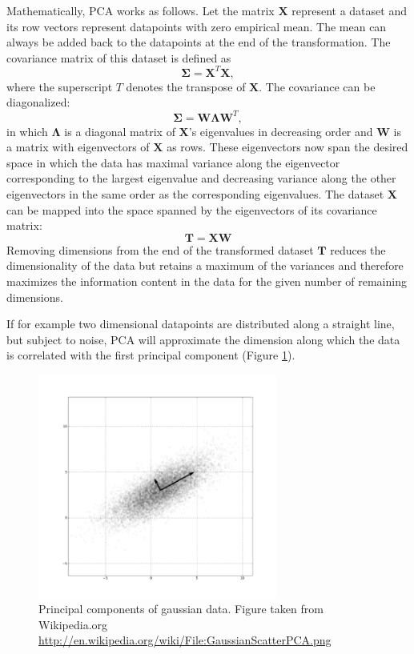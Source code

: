 \documentclass[english, a4paper, 12pt, titlepage, draft]{article}
\newcommand{\vect}[1]{\mathbf{#1}}
\begin{document}
Mathematically, PCA works as follows.
Let the matrix $\vect{X}$ represent a dataset and its row vectors represent datapoints with zero empirical mean.
The mean can always be added back to the datapoints at the end of the transformation.
The covariance matrix of this dataset is defined as
\begin{equation}
    \vect{\Sigma} = \vect{X}^{T} \vect{X},
\end{equation}
where the superscript $T$ denotes the transpose of $\vect{X}$.
The covariance can be diagonalized:
\begin{equation}
    \vect{\Sigma} = \vect{W} \vect{\Lambda} \vect{W}^{T},
\end{equation}
in which $\vect{\Lambda}$ is a diagonal matrix of $\vect{X}$'s eigenvalues in decreasing order and $\vect{W}$ is a matrix with eigenvectors of $\vect{X}$ as rows.
These eigenvectors now span the desired space in which the data has maximal variance along the eigenvector corresponding to the largest eigenvalue and decreasing variance along the other eigenvectors in the same order as the corresponding eigenvalues.
The dataset $\vect{X}$ can be mapped into the space spanned by the eigenvectors of its covariance matrix:
\begin{equation}
    \vect{T} = \vect{X} \vect{W}
\end{equation}
Removing dimensions from the end of the transformed dataset $\vect{T}$ reduces the dimensionality of the data but retains a maximum of the variances and therefore maximizes the information content in the data for the given number of remaining dimensions.

If for example two dimensional datapoints are distributed along a straight line, but subject to noise, PCA will approximate the dimension along which the data is correlated with the first principal component (Figure \ref{fig:PCA}).

\begin{figure}
    \centering
    \includegraphics[width=0.7\textwidth]{figures/GaussianScatterPCA.png}
    \caption{Principal components of gaussian data. Figure taken from Wikipedia.org \url{http://en.wikipedia.org/wiki/File:GaussianScatterPCA.png}}
    \label{fig:PCA}
\end{figure}         
\end{document}

